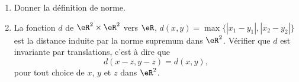 \begin{exercice}\label{exocontrolecontinu0011}

  \begin{enumerate}
  \item Donner la définition de norme. 
  \item La fonction $d$ de $\eR^2\times\eR^2$ vers $\eR$,  $d(x,y)= \max \{|x_1-y_1|, |x_2-y_2|\}$ est la distance induite par la norme supremum dans $\eR^2$. Vérifier que $d$ est invariante par translations, c'est à dire que 
\[
d(x-z,y-z)=d(x,y), 
\]
pour tout choice de $x$, $y$ et  $z$ dans $\eR^2$.
  \end{enumerate}

  
\end{exercice}
